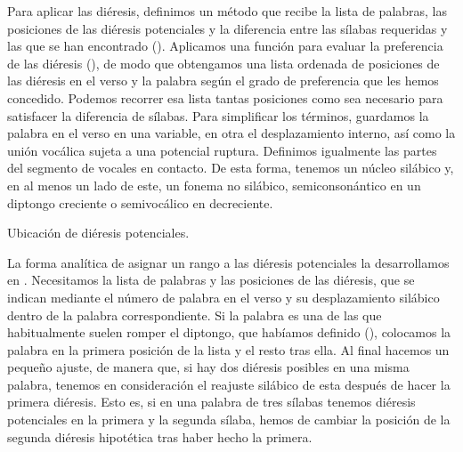 Para aplicar las diéresis, definimos un método que recibe la lista de palabras, las posiciones de las diéresis potenciales y la diferencia entre las sílabas requeridas y las que se han encontrado (). Aplicamos una función para evaluar la preferencia de las diéresis (), de modo que obtengamos una lista ordenada de posiciones de las diéresis en el verso y la palabra según el grado de preferencia que les hemos concedido. Podemos recorrer esa lista tantas posiciones como sea necesario para satisfacer la diferencia de sílabas. Para simplificar los términos, guardamos la palabra en el verso en una variable, en otra el desplazamiento interno, así como la unión vocálica sujeta a una potencial ruptura. Definimos igualmente las partes del segmento de vocales en contacto. De esta forma, tenemos un núcleo silábico y, en al menos un lado de este, un fonema no silábico, semiconsonántico en un diptongo creciente o semivocálico en decreciente.

\begin{algorithm}[!ht]
	\caption{Ubicación de diéresis potenciales.}\label{list:VerSeMetre11}
\end{algorithm}

La forma analítica de asignar un rango a las diéresis potenciales la desarrollamos en . Necesitamos la lista de palabras y las posiciones de las diéresis, que se indican mediante el número de palabra en el verso y su desplazamiento silábico dentro de la palabra correspondiente. Si la palabra es una de las que habitualmente suelen romper el diptongo, que habíamos definido (), colocamos la palabra en la primera posición de la lista y el resto tras ella. Al final hacemos un pequeño ajuste, de manera que, si hay dos diéresis posibles en una misma palabra, tenemos en consideración el reajuste silábico de esta después de hacer la primera diéresis. Esto es, si en una palabra de tres sílabas tenemos diéresis potenciales en la primera y la segunda sílaba, hemos de cambiar la posición de la segunda diéresis hipotética tras haber hecho la primera.

